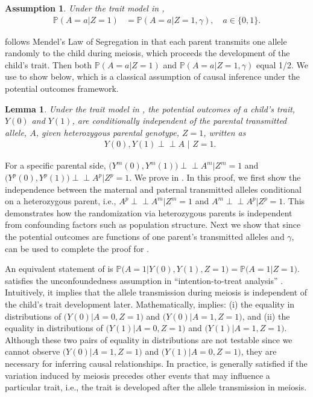 \documentclass[12pt]{extarticle}
\newtheorem{asm}{Assumption}%
\newtheorem{lem}{Lemma}%
\newcommand{\ind}{\perp\!\!\!\!\perp}
\newcommand{\pp}{\mathbb{P}}
\begin{document}
\begin{asm}\label{asm:law_segregation}
Under the trait model in ,
\begin{align*}
\pp(A=a|Z=1) &= \pp(A=a|Z=1, \gamma), \quad a\in \{0,1\}.
\end{align*} 
\end{asm}

\noindent {} follows Mendel's Law of Segregation in that each parent transmits one allele randomly to the child during meiosis, which proceeds the development of the child's trait. Then both $\pp(A=a|Z=1)$ and $\pp(A=a|Z=1,\gamma)$ equal 1/2. We use  to show  below, which is a classical assumption of causal inference under the potential outcomes framework. 

\begin{lem}\label{lem:law_segregation}
Under the trait model in , the potential outcomes of a child's trait, $Y(0)$ and $Y(1)$, are conditionally independent of the parental transmitted allele, $A$, given heterozygous parental genotype, $Z=1$, written as 
\begin{align*}
& Y(0),Y(1) \ind A \,\, \big| \,\, Z=1.
\end{align*}
\end{lem}

For a specific parental side, $\big(Y^m(0),Y^m(1)\big)\ind A^m\big| Z^m=1$ and $\big(Y^p(0),Y^p(1)\big)\ind A^p\big|Z^p=1$. We prove  in . In this proof, we first show the independence between the maternal and paternal transmitted alleles conditional on a heterozygous parent, i.e., $A^p \ind A^m | Z^m=1$ and $A^m \ind A^p | Z^p=1$. This demonstrates how the randomization via heterozygous parents is independent from confounding factors such as population structure. Next we show that since the potential outcomes are functions of one parent's transmitted alleles and $\gamma$,  can be used to complete the proof for . 

An equivalent statement of  is $\pp\big(A=1|Y(0),Y(1),Z=1\big) = \pp \big(A=1|Z=1\big)$.  satisfies the unconfoundedness assumption in ``intention-to-treat analysis'' \citep{imbens2015}. Intuitively, it implies that the allele transmission during meiosis is independent of the child's trait development later. Mathematically,  implies: (i) the equality in distributions of $\big(Y(0)|A=0,Z=1\big)$ and $\big(Y(0)|A=1,Z=1\big)$, and (ii) the equality in distributions of $\big(Y(1)|A=0,Z=1\big)$ and $\big(Y(1)|A=1,Z=1\big)$. Although these two pairs of equality in distributions are not testable since we cannot observe $\big(Y(0)|A=1,Z=1\big)$ and $\big(Y(1)|A=0,Z=1\big)$, they are necessary for inferring causal relationships. In practice,  is generally satisfied if the variation induced by meiosis precedes other events that may influence a particular trait, i.e., the trait is developed after the allele transmission in meiosis.
\end{document}
